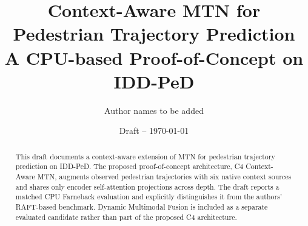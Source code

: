 \documentclass[11pt]{article}
\title{Context-Aware MTN for Pedestrian Trajectory Prediction\\\large A CPU-based Proof-of-Concept on IDD-PeD}
\author{Author names to be added}
\date{Draft -- \today}
\begin{document}
\maketitle
\begin{abstract}
This draft documents a context-aware extension of MTN for pedestrian trajectory prediction on IDD-PeD. The proposed proof-of-concept architecture, C4 Context-Aware MTN, augments observed pedestrian trajectories with six native context sources and shares only encoder self-attention projections across depth. The draft reports a matched CPU Farneback evaluation and explicitly distinguishes it from the authors' RAFT-based benchmark. Dynamic Multimodal Fusion is included as a separate evaluated candidate rather than part of the proposed C4 architecture.
\end{abstract}






\end{document}
